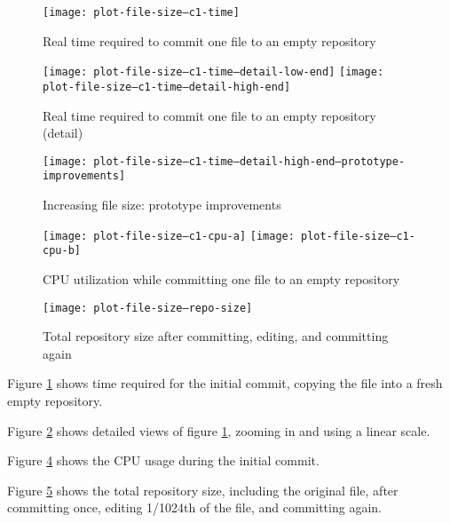 \documentclass[12pt,a4paper,two-side]{book}
\begin{document}
\begin{figure}[p]
  \caption{Real time required to commit one file to an empty repository}
  \label{fig:plot-file-size--c1-time}
  \centering
    \texttt{[image: plot-file-size--c1-time]}
\end{figure}

\begin{figure}[p]
  \caption{Real time required to commit one file to an empty repository (detail)}
  \label{fig:plot-file-size--c1-time--detail-high-end}
  \centering
    \texttt{[image: plot-file-size--c1-time--detail-low-end]}
    \texttt{[image: plot-file-size--c1-time--detail-high-end]}
\end{figure}

\begin{figure}[p]
  \caption{Increasing file size: prototype improvements}
  \label{fig:plot-file-size--c1-time--prototype-improvements}
  \centering
    \texttt{[image: plot-file-size--c1-time--detail-high-end--prototype-improvements]}
\end{figure}

\begin{figure}[p]
  \caption{CPU utilization while committing one file to an empty repository}
  \label{fig:plot-file-size--c1-cpu}
  \centering
    \texttt{[image: plot-file-size--c1-cpu-a]}
    \texttt{[image: plot-file-size--c1-cpu-b]}
\end{figure}

\begin{figure}[p]
  \caption{Total repository size after committing, editing, and committing again}
  \label{fig:plot-file-size--repo-size}
  \centering
    \texttt{[image: plot-file-size--repo-size]}
\end{figure}

Figure \ref{fig:plot-file-size--c1-time} shows time required for
the initial commit, copying the file into a fresh empty repository.

Figure \ref{fig:plot-file-size--c1-time--detail-high-end} shows
detailed views of figure \ref{fig:plot-file-size--c1-time}, zooming
in and using a linear scale.

Figure \ref{fig:plot-file-size--c1-cpu} shows the
CPU usage during the initial commit.

Figure \ref{fig:plot-file-size--repo-size} shows the total
repository size, including the original file, after committing once, editing
1/1024th of the file, and committing again.

\iffalse
\end{document}
